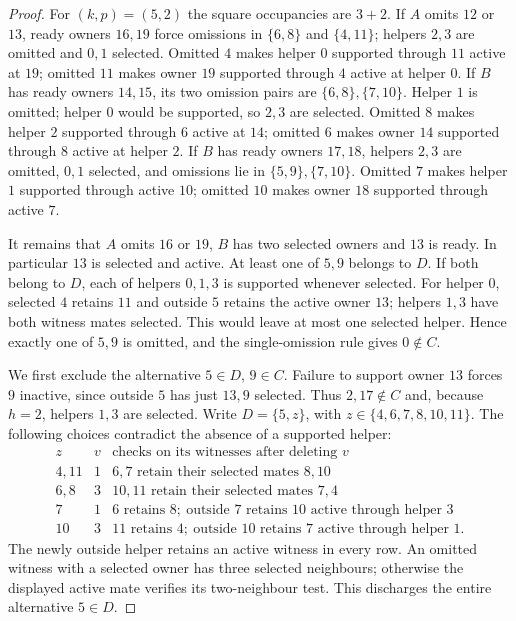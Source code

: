 \begin{proof}
For $(k,p)=(5,2)$ the square occupancies are $3+2$. If $A$ omits $12$ or
$13$, ready owners $16,19$ force omissions in $\{6,8\}$ and $\{4,11\}$;
helpers $2,3$ are omitted and $0,1$ selected. Omitted $4$ makes helper $0$
supported through $11$ active at $19$; omitted $11$ makes owner $19$
supported through $4$ active at helper $0$.
If $B$ has ready owners $14,15$, its two omission pairs are
$\{6,8\},\{7,10\}$. Helper $1$ is omitted; helper $0$ would be supported,
so $2,3$ are selected. Omitted $8$ makes helper $2$ supported through $6$
active at $14$; omitted $6$ makes owner $14$ supported through $8$ active
at helper $2$. If $B$ has ready owners $17,18$, helpers $2,3$ are omitted,
$0,1$ selected, and omissions lie in $\{5,9\},\{7,10\}$. Omitted $7$
makes helper $1$ supported through active $10$; omitted $10$ makes owner
$18$ supported through active $7$.

It remains that $A$ omits $16$ or $19$, $B$ has two selected owners and
$13$ is ready. In particular $13$ is selected and active. At least one of
$5,9$ belongs to $D$. If both belong to $D$, each of helpers $0,1,3$ is
supported whenever selected. For helper $0$, selected $4$ retains $11$ and
outside $5$ retains the active owner $13$; helpers $1,3$ have both witness
mates selected. This would leave at most one selected helper. Hence exactly
one of $5,9$ is omitted, and the single-omission rule gives $0\notin C$.

We first exclude the alternative $5\in D$, $9\in C$. Failure to support
owner $13$ forces $9$ inactive, since outside $5$ has just $13,9$ selected.
Thus $2,17\notin C$ and, because $h=2$, helpers $1,3$ are selected.
Write $D=\{5,z\}$, with $z\in\{4,6,7,8,10,11\}$. The following choices
contradict the absence of a supported helper:
\[
\begin{array}{c|c|l}
z&v&\text{checks on its witnesses after deleting }v\\\hline
4,11&1&6,7\text{ retain their selected mates }8,10\\
6,8&3&10,11\text{ retain their selected mates }7,4\\
7&1&6\text{ retains }8;\ \text{outside }7\text{ retains }10
       \text{ active through helper }3\\
10&3&11\text{ retains }4;\ \text{outside }10\text{ retains }7
       \text{ active through helper }1.
\end{array}
\]
The newly outside helper retains an active witness in every row. An omitted
witness with a selected owner has three selected neighbours; otherwise the
displayed active mate verifies its two-neighbour test. This discharges the
entire alternative $5\in D$.


\end{proof}
